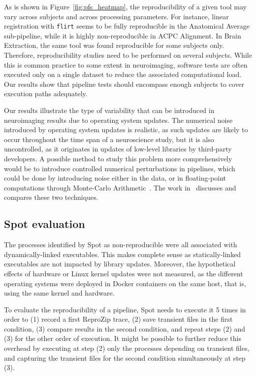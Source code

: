 \documentclass[a4paper,num-refs]{oup-contemporary}
\newcommand{\revised}[1]{\color{blue}#1\color{black}\xspace}
\newcommand{\reprozip}[0]{ReproZip\xspace}
\newcommand{\toolname}[0]{Spot\xspace}
\newcommand{\flirt}[0]{\texttt{flirt}\xspace}
\begin{document}
As is shown in Figure~\ref{fig:pfs_heatmap}, the reproducibility of
a given tool may vary across subjects and across processing parameters. For
instance, linear registration with \flirt seems to be fully reproducible in
the Anatomical Average sub-pipeline, while it is highly non-reproducible in
ACPC Alignment. In Brain Extraction, the same tool was found reproducible
for some subjects only. Therefore, reproducibility studies need to be
performed on several subjects. While this is common practice to some extent in neuroimaging,
software tests are often executed only on a single dataset to reduce the
associated computational load. Our results show that pipeline tests should
encompass enough subjects to cover execution paths adequately.

Our results illustrate the type of variability that can be introduced in
 neuroimaging results due to operating system updates. The
 numerical noise introduced by operating system updates is realistic, as
 such updates are likely to occur throughout the time span of a
 neuroscience study, but it is also uncontrolled, as it originates in
 updates of low-level libraries by third-party developers. A possible
 method to study this problem more comprehensively would be to introduce
 controlled numerical perturbations in pipelines, which could be done by
 introducing noise either in the data, or in floating-point computations
 through Monte-Carlo Arithmetic~\cite{Parker1997-qq}. The work
 in~\cite{kiar2019comparing} discusses and compares these two techniques.

\subsection{\toolname evaluation}

The processes identified by \toolname as non-reproducible were all
associated with dynamically-linked executables.
This makes complete sense as statically-linked executables are not
impacted by library updates. Moreover, the hypothetical effects of
hardware or Linux kernel updates were not measured, as the different
operating systems were deployed in Docker containers on the same host, that
is, using the same kernel and hardware.

\revised{
To evaluate the reproducibility of a pipeline, \toolname needs to execute it 5 times 
in order to (1) record a first \reprozip trace, (2) save transient files in the first condition, 
(3) compare results in the second condition, and repeat steps (2) and (3) for the other order of execution. 
It might be possible to further reduce this overhead by executing at step (2) only the processes 
depending on transient files, and capturing the transient files for the second condition simultaneously at step (3).}
\end{document}

